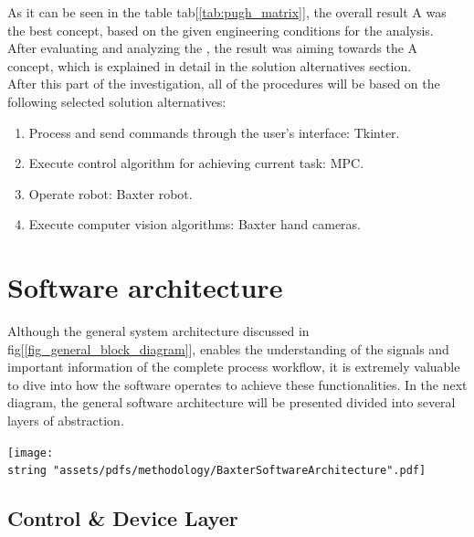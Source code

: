 \documentclass[11pt]{report} %
\begin{document}
As it can be seen in the table tab[\ref{tab:pugh_matrix}], the overall result A was the best concept, based on the given engineering conditions for the analysis.\\

After evaluating and analyzing the , the result was aiming towards the A concept, which is explained in detail in the solution alternatives section.\\

After this part of the investigation, all of the procedures will be based on the following selected solution alternatives:\\

\begin{enumerate}
    \item Process and send commands through the user's interface: Tkinter.
    \item Execute control algorithm for achieving current task: MPC.
    \item Operate robot: Baxter robot.
    \item Execute computer vision algorithms: Baxter hand cameras.
\end{enumerate}


\section{Software architecture}

Although the general system architecture discussed in fig[\ref{fig_general_block_diagram}], enables the understanding of the signals and important information of the complete process workflow, it is extremely valuable to dive into how the software operates to achieve these functionalities. In the next diagram, the general software architecture will be presented divided into several layers of abstraction.\\

\begin{center}
\texttt{[image: \\string "assets/pdfs/methodology/BaxterSoftwareArchitecture".pdf]}
\bigbreak
\begin{minipage}{\linewidth} %
\label{fig_general_software_architecture}
\end{minipage} \end{center}

\subsection{Control \& Device Layer}
\end{document}

